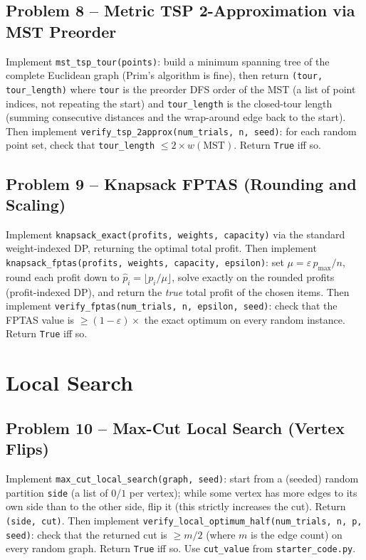 \documentclass[11pt]{article}
\begin{document}
\subsection*{Problem 8 -- Metric TSP 2-Approximation via MST Preorder}

Implement \texttt{mst\_tsp\_tour(points)}: build a minimum spanning tree of the complete
Euclidean graph (Prim's algorithm is fine), then return \texttt{(tour, tour\_length)}
where \texttt{tour} is the preorder DFS order of the MST (a list of point indices, not
repeating the start) and \texttt{tour\_length} is the closed-tour length (summing
consecutive distances and the wrap-around edge back to the start). Then implement
\texttt{verify\_tsp\_2approx(num\_trials, n, seed)}: for each random point set, check that
\texttt{tour\_length} $\le 2 \times w(\text{MST})$. Return \texttt{True} iff so.

\subsection*{Problem 9 -- Knapsack FPTAS (Rounding and Scaling)}

Implement \texttt{knapsack\_exact(profits, weights, capacity)} via the standard
weight-indexed DP, returning the optimal total profit. Then implement
\texttt{knapsack\_fptas(profits, weights, capacity, epsilon)}: set $\mu = \varepsilon\,
p_{\max}/n$, round each profit down to $\hat p_i = \lfloor p_i/\mu\rfloor$, solve exactly
on the rounded profits (profit-indexed DP), and return the \emph{true} total profit of the
chosen items. Then implement \texttt{verify\_fptas(num\_trials, n, epsilon, seed)}: check
that the FPTAS value is $\ge (1 - \varepsilon) \times$ the exact optimum on every random
instance. Return \texttt{True} iff so.

\newpage
\section{Local Search}

\subsection*{Problem 10 -- Max-Cut Local Search (Vertex Flips)}

Implement \texttt{max\_cut\_local\_search(graph, seed)}: start from a (seeded) random
partition \texttt{side} (a list of $0$/$1$ per vertex); while some vertex has more edges to
its own side than to the other side, flip it (this strictly increases the cut). Return
\texttt{(side, cut)}. Then implement \texttt{verify\_local\_optimum\_half(num\_trials, n,
p, seed)}: check that the returned cut is $\ge m/2$ (where $m$ is the edge count) on every
random graph. Return \texttt{True} iff so. Use \texttt{cut\_value} from
\texttt{starter\_code.py}.
\end{document}

